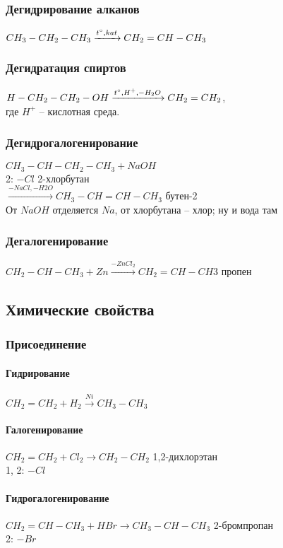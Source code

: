 \documentclass[a4paper]{article}
\begin{document}
	\subsubsection{Дегидрирование алканов}
	$CH_{3}-CH_{2}-CH_{3} \xrightarrow{t \degree, kat} CH_{2}=CH-CH_{3}$
	\subsubsection{Дегидратация спиртов}
	$H-CH_{2}-CH_{2}-OH \xrightarrow{t\degree, H^{+}, -H_{2}O} CH_{2}=CH_{2}$,\\
	где $H^{+}$ -- кислотная среда.
	\subsubsection{Дегидрогалогенирование}
	$CH_{3}-CH-CH_{2}-CH_{3}+NaOH$\\
	2: $-Cl$ 2-хлорбутан\\
	$\xrightarrow{-NaCl,-H2O} CH_{3}-CH=CH-CH_{3}$ бутен-2\\
	От $NaOH$ отделяется $Na$, от хлорбутана -- хлор; ну и вода там
	\subsubsection{Дегалогенирование}
	$CH_{2}-CH-CH_{3}+Zn \xrightarrow{-ZnCl_{2}} CH_{2}=CH-CH{3}$ пропен
\subsection{Химические свойства}
	\subsubsection{Присоединение}
		\paragraph{Гидрирование}
		$CH_{2}=CH_{2}+H_2 \xrightarrow{Ni} CH_3-CH_3$
		\paragraph{Галогенирование}
		$CH_2=CH_2+Cl_2 \xrightarrow{} CH_2-CH_2$
		1,2-дихлорэтан\\
		1, 2: $-Cl$
		\paragraph{Гидрогалогенирование}
		$CH_2=CH-CH_{3}+HBr \xrightarrow{} CH_3-CH-CH_3$ 2-бромпропан\\
		2: $-Br$
\end{document}
